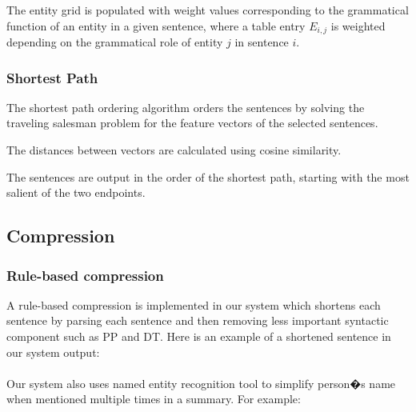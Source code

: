 \documentclass[11pt]{article}
\begin{document}
The entity grid is populated with weight values corresponding to the grammatical function of an entity in a given sentence, where a table entry $E_{i,j}$ is weighted depending on the grammatical role of entity $j$ in sentence $i$. 


\subsubsection{Shortest Path}
The shortest path ordering algorithm orders the sentences by solving the traveling salesman problem for the feature vectors of the selected sentences. 

The distances between vectors are calculated using cosine similarity.

The sentences are output in the order of the shortest path, starting with the most salient of the two endpoints.

\subsection{Compression}

\subsubsection{Rule-based compression}
A rule-based compression is implemented in our system which shortens each sentence by parsing each sentence and then removing less important syntactic component such as PP and DT. Here is an example of a shortened sentence in our system output:
\\

\\

Our system also uses named entity recognition tool to simplify person�s name when mentioned multiple times in a summary. For example: 
\\

\\
\end{document}
